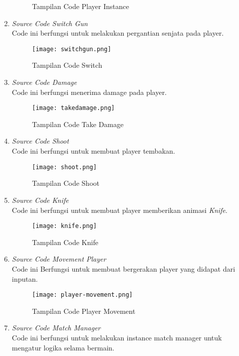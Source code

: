 \begin{enumerate}
\begin{figure}[h]
        \caption{Tampilan Code Player Instance}
        \label{fig:playerinstance}
    \end{figure}
    \item \textit{Source Code Switch Gun} \\ 
    Code ini berfungsi untuk melakukan pergantian senjata pada player.
    \begin{figure}[h]
        \centering
        \texttt{[image: switchgun.png]}
        \caption{Tampilan Code Switch}
        \label{fig:switchgun}
    \end{figure}
    \item \textit{Source Code Damage} \\
    Code ini berfungsi menerima damage pada player.
    \newpage
    \begin{figure}[h]
        \centering
        \texttt{[image: takedamage.png]}
        \caption{Tampilan Code Take Damage}
        \label{fig:takedamage}
    \end{figure}
    \item \textit{Source Code Shoot} \\ 
    Code ini berfungsi untuk membuat player tembakan.
    \begin{figure}[h]
        \centering
        \texttt{[image: shoot.png]}
        \caption{Tampilan Code Shoot}
        \label{fig:shoot}
    \end{figure}
    \newpage
    \item \textit{Source Code Knife} \\ 
    Code ini berfungsi untuk membuat player memberikan animasi \textit{Knife}.
    \begin{figure}[h]
        \centering
        \texttt{[image: knife.png]}
        \caption{Tampilan Code Knife}
        \label{fig:knife}
    \end{figure}
    \item \textit{Source Code Movement Player} \\ 
    Code ini Berfungsi untuk membuat bergerakan player yang didapat dari inputan.
    \newpage
    \begin{figure}[h]
        \centering
        \texttt{[image: player-movement.png]}
        \caption{Tampilan Code Player Movement}
        \label{fig:movementp}
    \end{figure}
    \item \textit{Source Code Match Manager} \\
    Code ini berfungsi untuk melakukan instance match manager untuk mengatur logika selama bermain.

\end{enumerate}
